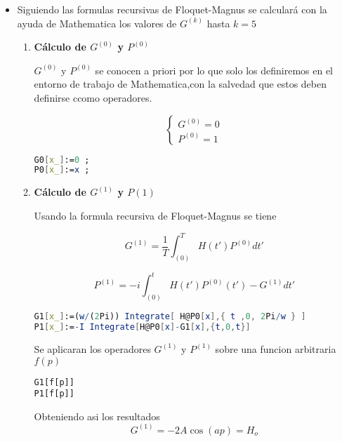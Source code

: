 \begin{itemize}
\item Siguiendo las formulas recursivas de Floquet-Magnus se calculará con la ayuda de Mathematica los valores de $G^{(k)}$ hasta $k=5$


\begin{enumerate}

    \item \textbf{Cálculo de $G^{(0)}$ y $P^{(0)}$}
    
$G^{(0)}$ y $P^{(0)}$ se conocen a priori por lo que solo los definiremos en el entorno de trabajo de Mathematica,con la salvedad que estos deben definirse ccomo operadores.
    
\begin{equation}
    \begin{cases}
        G^{(0)}=0\\
        P^{(0)}=1
    \end{cases}
\end{equation}

\begin{lstlisting}[language=Mathematica]
G0[x_]:=0 ;
P0[x_]:=x ;
\end{lstlisting}

\item \textbf{Cálculo de $G^{(1)}$ y $P{(1)}$}

Usando la formula recursiva de Floquet-Magnus se tiene 

\begin{equation}
    G^{(1)}=\frac{1}{T}\int^{T}_{(0)} H(t')P^{(0)}dt'
\end{equation}

\begin{equation}
    P^{(1)}=-i\int^{t}_{(0)} H(t')P^{(0)}(t')-G^{(1)}dt'
\end{equation}

\begin{lstlisting}[language=Mathematica]
G1[x_]:=(w/(2Pi)) Integrate[ H@P0[x],{ t ,0, 2Pi/w } ]
P1[x_]:=-I Integrate[H@P0[x]-G1[x],{t,0,t}]
\end{lstlisting}

Se aplicaran los operadores $G^{(1)}$ y $P^{(1)}$ sobre una funcion arbitraria $f(p)$

\begin{lstlisting}
G1[f[p]]
P1[f[p]]
\end{lstlisting}

Obteniendo asi los resultados 
\begin{equation}
    G^{(1)}=-2A\cos(ap)=H_o
\end{equation}


\end{enumerate}
\end{itemize}
